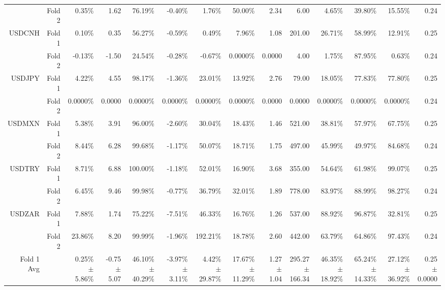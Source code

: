 \begin{table}[H]
{\begin{tabular}{rrrrrrrrrrrrrr}
 & Fold 2 & 0.35\% & 1.62 & 76.19\% & -0.40\% & 1.76\% & 50.00\% & 2.34 & 6.00 & 4.65\% & 39.80\% & 15.55\% & 0.24 \\
USDCNH & Fold 1 & 0.10\% & 0.35 & 56.27\% & -0.59\% & 0.49\% & 7.96\% & 1.08 & 201.00 & 26.71\% & 58.99\% & 12.91\% & 0.25 \\
 & Fold 2 & -0.13\% & -1.50 & 24.54\% & -0.28\% & -0.67\% & 0.0000\% & 0.0000 & 4.00 & 1.75\% & 87.95\% & 0.63\% & 0.24 \\
USDJPY & Fold 1 & 4.22\% & 4.55 & 98.17\% & -1.36\% & 23.01\% & 13.92\% & 2.76 & 79.00 & 18.05\% & 77.83\% & 77.80\% & 0.25 \\
 & Fold 2 & 0.0000\% & 0.0000 & 0.0000\% & 0.0000\% & 0.0000\% & 0.0000\% & 0.0000 & 0.0000 & 0.0000\% & 0.0000\% & 0.0000\% & 0.24 \\
USDMXN & Fold 1 & 5.38\% & 3.91 & 96.00\% & -2.60\% & 30.04\% & 18.43\% & 1.46 & 521.00 & 38.81\% & 57.97\% & 67.75\% & 0.25 \\
 & Fold 2 & 8.44\% & 6.28 & 99.68\% & -1.17\% & 50.07\% & 18.71\% & 1.75 & 497.00 & 45.99\% & 49.97\% & 84.68\% & 0.24 \\
USDTRY & Fold 1 & 8.71\% & 6.88 & 100.00\% & -1.18\% & 52.01\% & 16.90\% & 3.68 & 355.00 & 54.64\% & 61.98\% & 99.07\% & 0.25 \\
 & Fold 2 & 6.45\% & 9.46 & 99.98\% & -0.77\% & 36.79\% & 32.01\% & 1.89 & 778.00 & 83.97\% & 88.99\% & 98.27\% & 0.24 \\
USDZAR & Fold 1 & 7.88\% & 1.74 & 75.22\% & -7.51\% & 46.33\% & 16.76\% & 1.26 & 537.00 & 88.92\% & 96.87\% & 32.81\% & 0.25 \\
 & Fold 2 & 23.86\% & 8.20 & 99.99\% & -1.96\% & 192.21\% & 18.78\% & 2.60 & 442.00 & 63.79\% & 64.86\% & 97.43\% & 0.24 \\
\midrule
\midrule
Fold 1 Avg &  & \shortstack{0.25\% \\ $\pm$ 5.86\%} & \shortstack{-0.75 \\ $\pm$ 5.07} & \shortstack{46.10\% \\ $\pm$ 40.29\%} & \shortstack{-3.97\% \\ $\pm$ 3.11\%} & \shortstack{4.42\% \\ $\pm$ 29.87\%} & \shortstack{17.67\% \\ $\pm$ 11.29\%} & \shortstack{1.27 \\ $\pm$ 1.04} & \shortstack{295.27 \\ $\pm$ 166.34} & \shortstack{46.35\% \\ $\pm$ 18.92\%} & \shortstack{65.24\% \\ $\pm$ 14.33\%} & \shortstack{27.12\% \\ $\pm$ 36.92\%} & \shortstack{0.25 \\ $\pm$ 0.0000} \\

\end{tabular}}
\end{table}
